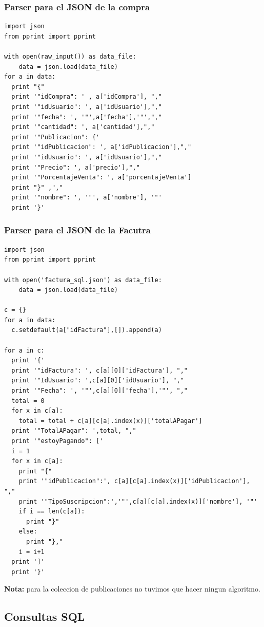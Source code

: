 \documentclass[a4paper, 10pt, twoside]{article}
\begin{document}
\subsubsection{Parser para el JSON de la compra}

\begin{verbatim}
import json
from pprint import pprint

with open(raw_input()) as data_file:    
    data = json.load(data_file)
for a in data:
  print "{"
  print '"idCompra": ' , a['idCompra'], ","
  print '"idUsuario": ', a['idUsuario'],","
  print '"fecha": ', '"',a['fecha'],'"',","
  print '"cantidad": ', a['cantidad'],","
  print '"Publicacion": {'
  print '"idPublicacion": ', a['idPublicacion'],","
  print '"idUsuario": ', a['idUsuario'],","
  print '"Precio": ', a['precio'],","
  print '"PorcentajeVenta": ', a['porcentajeVenta']
  print "}" ,","
  print '"nombre": ', '"', a['nombre'], '"'
  print '}'

\end{verbatim}

\newpage
\subsubsection{Parser para el JSON de la Facutra}

\begin{verbatim}
import json
from pprint import pprint

with open('factura_sql.json') as data_file:    
    data = json.load(data_file)

c = {}
for a in data:
  c.setdefault(a["idFactura"],[]).append(a)

for a in c:
  print '{'
  print '"idFactura": ', c[a][0]['idFactura'], ","
  print '"IdUsuario": ',c[a][0]['idUsuario'], ","
  print '"Fecha": ', '"',c[a][0]['fecha'],'"', ","
  total = 0
  for x in c[a]:
    total = total + c[a][c[a].index(x)]['totalAPagar']
  print '"TotalAPagar": ',total, ","
  print '"estoyPagando": ['
  i = 1
  for x in c[a]:
    print "{"
    print '"idPublicacion":', c[a][c[a].index(x)]['idPublicacion'], ","
    print '"TipoSuscripcion":','"',c[a][c[a].index(x)]['nombre'], '"'
    if i == len(c[a]):
      print "}"
    else:
      print "},"
    i = i+1
  print ']'
  print '}'

\end{verbatim}

\textbf{Nota:} para la coleccion de publicaciones no tuvimos que hacer ningun algoritmo.


\subsection{Consultas SQL}
\end{document}
